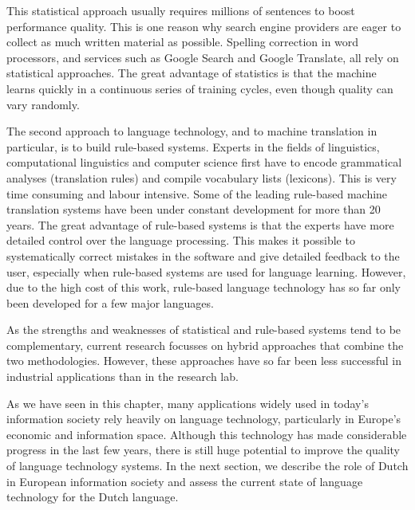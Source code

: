\documentclass[]{../../metanetpaper}
\begin{document}
\begin{multicols}{2}
This statistical approach usually requires millions of sentences to boost performance quality. This is one reason why search engine providers are eager to collect as much written material as possible. Spelling correction in word processors, and services such as Google Search and Google Translate, all rely on statistical approaches. The great advantage of statistics is that the machine learns quickly in a continuous series of training cycles, even though quality can vary randomly.

The second approach to language technology, and to machine translation in particular, is to build rule-based systems. Experts in the fields of linguistics, computational linguistics and computer science first have to encode grammatical analyses (translation rules) and compile vocabulary lists (lexicons). This is very time consuming and labour intensive. Some of the leading rule-based machine translation systems have been under constant development for more than 20 years. The great advantage of rule-based systems is that the experts have more detailed control over the language processing. This makes it possible to systematically correct mistakes in the software and give detailed feedback to the user, especially when rule-based systems are used for language learning. However, due to the high cost of this work, rule-based language technology has so far only been developed for a few major languages. 


As the strengths and weaknesses of statistical and rule-based systems tend to be complementary, current research focusses on hybrid approaches that combine the two methodologies. However, these approaches have so far been less successful in industrial applications than in the research lab. 

As we have seen in this chapter, many applications widely used in today’s information society rely heavily on language technology, particularly in Europe’s economic and information space. Although this technology has made considerable progress in the last few years, there is still huge potential to improve the quality of language technology systems. In the next section, we describe the role of Dutch in European information society and assess the current state of language technology for the Dutch language.
\end{multicols}

\clearpage
\end{document}
